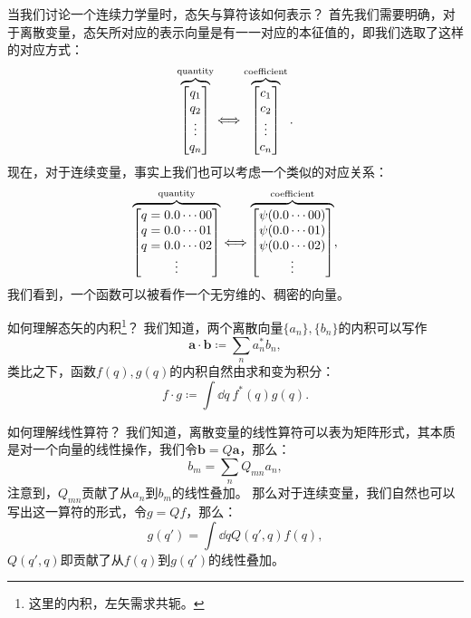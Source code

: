 \begin{tcolorbox}[breakable, colframe=purple, colback=red!10, title={\textbf{关于连续力学量的算符}}]
当我们讨论一个连续力学量时，态矢与算符该如何表示？
首先我们需要明确，对于离散变量，态矢所对应的表示向量是有一一对应的本征值的，即我们选取了这样的对应方式：
\begin{equation}
    \overbrace{
    \begin{bmatrix}
        q_1 \\ q_2 \\ \vdots \\ q_n
    \end{bmatrix}}^{\rm{quantity}}
    \Longleftrightarrow
    \overbrace{
    \begin{bmatrix}
        c_1 \\ c_2 \\ \vdots \\ c_n
    \end{bmatrix}}^{\rm{coefficient}}.
\end{equation}
现在，对于连续变量，事实上我们也可以考虑一个类似的对应关系：
\begin{equation}
    \overbrace{
    \begin{bmatrix}
        q=0.0 \cdots 00 \\ q=0.0 \cdots 01 \\ q=0.0 \cdots 02 \\ \vdots
    \end{bmatrix}}^{\rm{quantity}}
    \Longleftrightarrow
    \overbrace{
    \begin{bmatrix}
        \psi(0.0 \cdots 00) \\ \psi(0.0 \cdots 01) \\ \psi(0.0 \cdots 02) \\ \vdots
    \end{bmatrix}}^{\rm{coefficient}},
\end{equation}
我们看到，一个函数可以被看作一个无穷维的、稠密的向量。

如何理解态矢的内积\footnote{这里的内积，左矢需求共轭。}？
我们知道，两个离散向量$\{a_n\},\{b_n\}$的内积可以写作
\begin{equation}
    \bm{a}\cdot\bm{b} \coloneq \sum_n a_n^* b_n,
\end{equation}
类比之下，函数$f(q), g(q)$的内积自然由求和变为积分：
\begin{equation}
    f \cdot g \coloneq \int \dd q\ f^*(q) g(q).
\end{equation}

如何理解线性算符？
我们知道，离散变量的线性算符可以表为矩阵形式，其本质是对一个向量的线性操作，我们令$\bm{b}=Q\bm{a}$，那么：
\begin{equation}
    b_m = \sum_n Q_{mn} a_n,
\end{equation}
注意到，$Q_{mn}$贡献了从$a_n$到$b_m$的线性叠加。
那么对于连续变量，我们自然也可以写出这一算符的形式，令$g=Qf$，那么：
\begin{equation}
    \label{eq:cmr_operator_cont}
    g(q') = \int \dd q Q(q',q) f(q),
\end{equation}
$Q(q',q)$即贡献了从$f(q)$到$g(q')$的线性叠加。


\end{tcolorbox}
